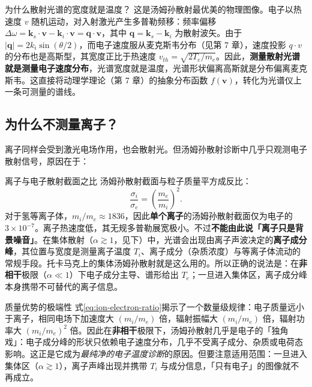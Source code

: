 \documentclass[12pt,a4paper,openany,oneside]{book}
\newcommand{\vect}[1]{\bm{#1}}
\begin{document}
\begin{insight}{为什么散射光谱的宽度就是温度？}{}
这是汤姆孙散射最优美的物理图像。电子以热速度 $v$ 随机运动，对入射激光产生多普勒频移：频率偏移 $\Delta\omega = \vect{k}_s\cdot\vect{v} - \vect{k}_i\cdot\vect{v} = \vect{q}\cdot\vect{v}$，其中 $\vect{q} = \vect{k}_s - \vect{k}_i$ 为散射波矢。由于 $|\vect{q}| = 2k_i\sin(\theta/2)$，而电子速度服从麦克斯韦分布（见第 7 章），速度投影 $q\cdot v$ 的分布也是高斯型，其宽度正比于热速度 $v_{th} = \sqrt{2T_e/m_e}$。因此，\textbf{测量散射光谱就是测量电子速度分布}，光谱宽度就是温度，光谱形状偏离高斯就是分布偏离麦克斯韦。这直接将动理学理论（第 7 章）的抽象分布函数 $f(\vect{v})$，转化为光谱仪上一条可测量的谱线。
\end{insight}

\subsection{为什么不测量离子？}

离子同样会受到激光电场作用，也会散射光。但汤姆孙散射诊断中几乎只观测电子散射信号，原因在于：

\begin{corollary}{离子与电子散射截面之比}{}{}
汤姆孙散射截面与粒子质量平方成反比：
\begin{equation}
\frac{\sigma_i}{\sigma_e} = \left(\frac{m_e}{m_i}\right)^2.
\label{eq:ion-electron-ratio}
\end{equation}
对于氢等离子体，$m_i/m_e \approx 1836$，因此\textbf{单个离子}的汤姆孙散射截面仅为电子的 $3\times 10^{-7}$。离子热速度低，其无规多普勒展宽极小。不过\textbf{不能由此说「离子只是背景噪音」}。在集体散射（$\alpha\gtrsim1$，见下）中，光谱会出现由离子声波决定的\textbf{离子成分峰}，其位置与宽度是测量离子温度 $T_i$、离子成分（杂质浓度）与等离子体流动的常规手段。托卡马克上的集体汤姆孙散射就是这么用的。所以正确的说法是：在\textbf{非相干}极限（$\alpha\ll1$）下电子成分主导、谱形给出 $T_e$；一旦进入集体区，离子成分峰本身携带不可替代的离子信息。
\end{corollary}

\begin{insight}{质量优势的极端性}{}
式\eqref{eq:ion-electron-ratio}揭示了一个数量级规律：电子质量远小于离子，相同电场下加速度大 $(m_i/m_e)$ 倍，辐射振幅大 $(m_i/m_e)$ 倍，辐射功率大 $(m_i/m_e)^2$ 倍。因此在\textbf{非相干}极限下，汤姆孙散射几乎是电子的「独角戏」：电子成分峰的形状只依赖电子速度分布，几乎不受离子成分、杂质或电荷态影响。这正是它成为\emph{最纯净的电子温度诊断}的原因。但要注意适用范围：一旦进入集体区（$\alpha\gtrsim1$），离子声峰出现并携带 $T_i$ 与成分信息，「只有电子」的图像就不再成立。
\end{insight}
\end{document}
